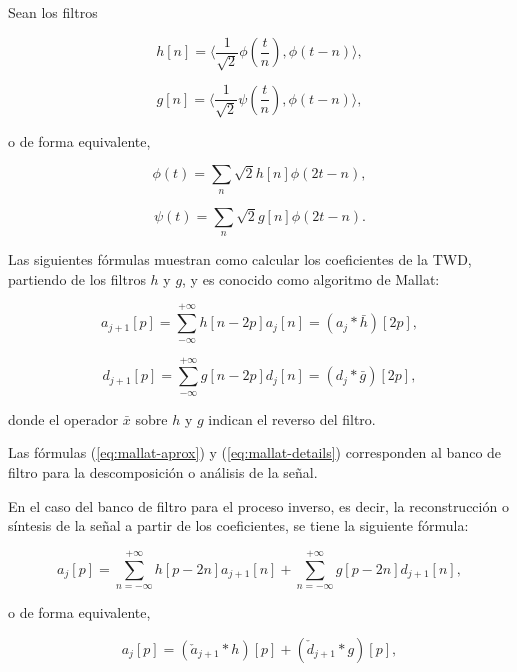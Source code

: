 Sean los filtros 

\begin{equation}
	h[n] = \langle \frac{1}{\sqrt{2}} \phi\left(\frac{t}{n}\right), \phi(t-n) \rangle,
\end{equation}

\begin{equation}
	g[n] = \langle \frac{1}{\sqrt{2}} \psi\left(\frac{t}{n}\right), \phi(t-n) \rangle,
\end{equation}

\noindent o de forma equivalente,

\begin{equation}
	\phi(t) = \sum_n \sqrt{2}h[n]\phi(2t-n),
\end{equation}

\begin{equation}
	\psi(t) = \sum_n \sqrt{2}g[n]\phi(2t-n).
\end{equation}

Las siguientes fórmulas muestran como calcular los coeficientes de la TWD, partiendo de los filtros 
$h$ y $g$, y es conocido como algoritmo de Mallat:

\begin{equation}\label{eq:mallat-aprox}
	a_{j+1}[p] = \sum_{-\infty}^{+\infty} h[n-2p]a_j[n] = (a_j * \bar h)[2p],
\end{equation}

\begin{equation}\label{eq:mallat-details}
	d_{j+1}[p] = \sum_{-\infty}^{+\infty} g[n-2p]d_j[n] = (d_j * \bar g)[2p],
\end{equation}

\noindent donde el operador $\bar x$ sobre $h$ y $g$ indican el reverso del filtro.

Las fórmulas (\ref{eq:mallat-aprox}) y (\ref{eq:mallat-details}) corresponden al banco de filtro para la
descomposición o análisis de la señal. 

En el caso del banco de filtro para el proceso inverso, es decir, la reconstrucción o síntesis de la señal a 
partir de los coeficientes, se tiene la siguiente fórmula:

\begin{equation}
	a_j[p] = \sum_{n= -\infty}^{+\infty} h[p-2n]a_{j+1}[n] + \sum_{n= -\infty}^{+\infty}g[p-2n]d_{j+1}[n],
\end{equation}

\noindent o de forma equivalente, 

\begin{equation}
	a_j[p] = ( \check a_{j+1} * h )[p] + ( \check d_{j+1} * g )[p],
\end{equation}

